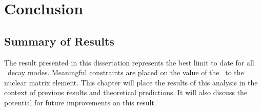 \documentclass[/main.tex]{subfiles}
\begin{document}
\graphicspath{{./pics/}{ch6/pics/}}

\onlyinsubfile{\textpages}
\chapter{Conclusion}
\section{Summary of Results}
The result presented in this dissertation represents the best limit to date for all \bbes\ decay modes.
Meaningful constraints are placed on the value of the \bbes\ to the  nuclear matrix element.
This chapter will place the results of this analysis in the context of previous results and theoretical predictions.
It will also discuss the potential for future improvements on this result.
\\
\end{document}
